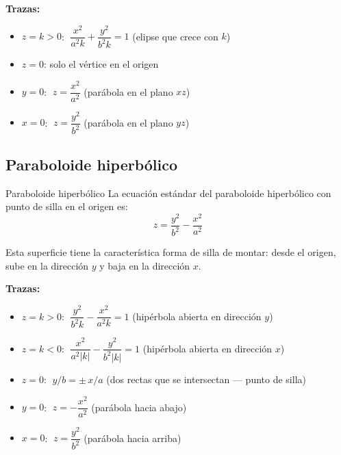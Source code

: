 \textbf{Trazas:}
\begin{itemize}
    \item $z = k > 0$: $\;\dfrac{x^2}{a^2 k} + \dfrac{y^2}{b^2 k} = 1$ \quad (elipse que crece con $k$)
    \item $z = 0$: solo el vértice en el origen
    \item $y = 0$: $\;z = \dfrac{x^2}{a^2}$ \quad (parábola en el plano $xz$)
    \item $x = 0$: $\;z = \dfrac{y^2}{b^2}$ \quad (parábola en el plano $yz$)
\end{itemize}

\begin{center}
\end{center}

\subsection{Paraboloide hiperbólico}

\begin{mydefinition}{Paraboloide hiperbólico}
La ecuación estándar del paraboloide hiperbólico con punto de silla en el origen es:
\[
z = \frac{y^2}{b^2} - \frac{x^2}{a^2}
\]
\end{mydefinition}

Esta superficie tiene la característica forma de silla de montar: desde el origen, sube en la dirección $y$ y baja en la dirección $x$.

\textbf{Trazas:}
\begin{itemize}
    \item $z = k > 0$: $\;\dfrac{y^2}{b^2 k} - \dfrac{x^2}{a^2 k} = 1$ \quad (hipérbola abierta en dirección $y$)
    \item $z = k < 0$: $\;\dfrac{x^2}{a^2|k|} - \dfrac{y^2}{b^2|k|} = 1$ \quad (hipérbola abierta en dirección $x$)
    \item $z = 0$: $\;y/b = \pm\, x/a$ \quad (dos rectas que se intersectan --- punto de silla)
    \item $y = 0$: $\;z = -\dfrac{x^2}{a^2}$ \quad (parábola hacia abajo)
    \item $x = 0$: $\;z = \dfrac{y^2}{b^2}$ \quad (parábola hacia arriba)
\end{itemize}

